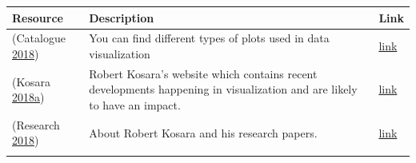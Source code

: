 \documentclass[]{book}
\begin{document}
\begin{longtable}[]{@{}lll@{}}
\toprule
\begin{minipage}[b]{0.15\columnwidth}\raggedright
\textbf{Resource}\strut
\end{minipage} & \begin{minipage}[b]{0.28\columnwidth}\raggedright
\textbf{Description}\strut
\end{minipage} & \begin{minipage}[b]{0.48\columnwidth}\raggedright
\textbf{Link}\strut
\end{minipage}\tabularnewline
\midrule
\endhead
\begin{minipage}[t]{0.15\columnwidth}\raggedright
(Catalogue \protect\hyperlink{ref-charts_viz}{2018})\strut
\end{minipage} & \begin{minipage}[t]{0.28\columnwidth}\raggedright
You can find different types of plots used in data visualization\strut
\end{minipage} & \begin{minipage}[t]{0.48\columnwidth}\raggedright
\href{https://datavizcatalogue.com/search.html}{link}\strut
\end{minipage}\tabularnewline
\begin{minipage}[t]{0.15\columnwidth}\raggedright
(Kosara \protect\hyperlink{ref-eagereyes_viz}{2018}\protect\hyperlink{ref-eagereyes_viz}{a})\strut
\end{minipage} & \begin{minipage}[t]{0.28\columnwidth}\raggedright
Robert Kosara's website which contains recent developments happening in visualization and are likely to have an impact.\strut
\end{minipage} & \begin{minipage}[t]{0.48\columnwidth}\raggedright
\href{https://eagereyes.org/}{link}\strut
\end{minipage}\tabularnewline
\begin{minipage}[t]{0.15\columnwidth}\raggedright
(Research \protect\hyperlink{ref-research_viz}{2018})\strut
\end{minipage} & \begin{minipage}[t]{0.28\columnwidth}\raggedright
About Robert Kosara and his research papers.\strut
\end{minipage} & \begin{minipage}[t]{0.48\columnwidth}\raggedright
\href{http://researchviz.com/}{link}\strut
\end{minipage}\tabularnewline
\begin{minipage}[t]{0.15\columnwidth}\raggedright

\end{minipage}
\end{longtable}
\end{document}
